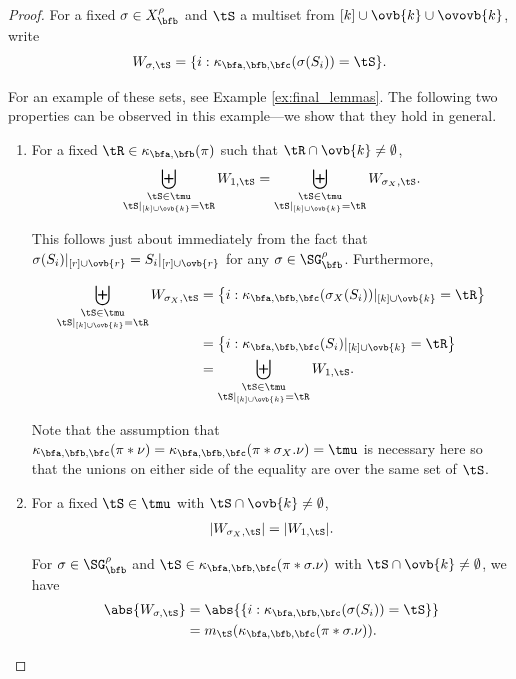 \begin{proof}
For a fixed $\sigma\in X_\bfb^\rho$ and $\tS$ a multiset from $[k]\cup\ovb{k}\cup\ovovb{k}$, write \[W_{\sigma,\tS}=\{i:\kappa_{\bfa,\bfb,\bfc}(\sigma(S_i))=\tS\}.\]

For an example of these sets, see Example \ref{ex:final_lemmas}. The following two properties can be observed in this example---we show that they hold in general.

\begin{enumerate}
    \item[1.] For a fixed $\tR\in\kappa_{\bfa,\bfb}(\pi)$ such that $\tR\cap \ovb{k}\neq\emptyset$,\begin{align*}
    \biguplus_{\substack{\tS\in\tmu\\\tS|_{[k]\cup\ovb{k}}=\tR}}W_{1,\tS}=\biguplus_{\substack{\tS\in\tmu\\\tS|_{[k]\cup\ovb{k}}=\tR}}W_{\sigma_X,\tS}.
\end{align*}

This follows just about immediately from the fact that $\sigma(S_i)|_{[r]\cup\ovb{r}}=S_i|_{[r]\cup\ovb{r}}$ for any $\sigma\in \SG_\bfb^\rho$. Furthermore,

\begin{align*}
    \biguplus_{\substack{\tS\in\tmu\\\tS|_{[k]\cup\ovb{k}}=\tR}}W_{\sigma_X,\tS}&=\left\{i:\kappa_{\bfa,\bfb,\bfc}(\sigma_X(S_i))|_{[k]\cup\ovb{k}}=\tR\right\}\\
    &=\left\{i:\kappa_{\bfa,\bfb,\bfc}(S_i)|_{[k]\cup\ovb{k}}=\tR\right\}\\
    &=\biguplus_{\substack{\tS\in\tmu\\\tS|_{[k]\cup\ovb{k}}=\tR}}W_{1,\tS}.
\end{align*}

Note that the assumption that $\kappa_{\bfa,\bfb,\bfc}(\pi\ast\nu)=\kappa_{\bfa,\bfb,\bfc}(\pi\ast \sigma_X.\nu)=\tmu$ is necessary here so that the unions on either side of the equality are over the same set of $\tS$.

\item[2.] For a fixed $\tS\in\tmu$ with $\tS\cap\ovb{k}\neq\emptyset$, \begin{align*}
    |W_{\sigma_X,\tS}|=|W_{1,\tS}|.
\end{align*}

For $\sigma\in \SG_\bfb^\rho$ and $\tS\in\kappa_{\bfa,\bfb,\bfc}(\pi\ast\sigma.\nu)$ with $\tS\cap\ovb{k}\neq\emptyset$, we have
\begin{align*}
    \abs{W_{\sigma,\tS}}&=\abs{\left\{i:\kappa_{\bfa,\bfb,\bfc}(\sigma(S_i))=\tS\right\}}\\
    &=m_{\tS}(\kappa_{\bfa,\bfb,\bfc}(\pi\ast\sigma.\nu)).
\end{align*}


\end{enumerate}
\end{proof}
